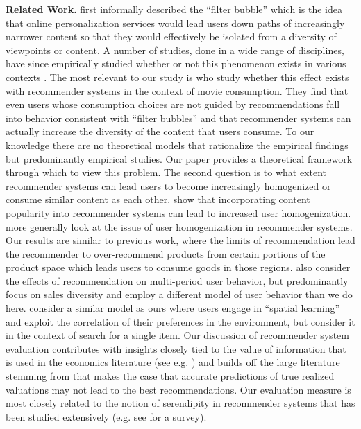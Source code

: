 \documentclass[sigconf]{acmart}
\begin{document}
\textbf{Related Work.} 
\cite{pariser2011filter} first informally described the ``filter bubble'' which is the idea that online personalization services would lead users down paths of increasingly narrower content so that they would effectively be isolated from a diversity of viewpoints or content. A number of studies, done in a wide range of disciplines, have since empirically studied whether or not this phenomenon exists in various contexts \cite{flaxman2016filter,hosanagar2013will,moller2018blame,nguyen2014exploring}. The most relevant to our study is \cite{nguyen2014exploring} who study whether this effect exists with recommender systems in the context of movie consumption. They find that even users whose consumption choices are not guided by recommendations fall into behavior consistent with ``filter bubbles'' and that recommender systems can actually increase the diversity of the content that users consume. To our knowledge there are no theoretical models that rationalize the empirical findings but predominantly empirical studies. Our paper provides a theoretical framework through which to view this problem.
The second question is to what extent recommender systems can lead users to become increasingly homogenized or consume similar content as each other. \cite{celam2008hits,treviranus2009value} show that incorporating content popularity into recommender systems can lead to increased user homogenization. \cite{chaney2018algorithmic} more generally look at the issue of user homogenization in recommender systems. Our results are similar to previous work, where the limits of recommendation lead the recommender to over-recommend products from certain portions of the product space which leads users to consume goods in those regions.
\cite{fleder2009blockbuster} also consider the effects of recommendation on multi-period user behavior, but predominantly focus on sales diversity and employ a different model of user behavior than we do here. \cite{hodgson2019horse} consider a similar model as ours where users engage in ``spatial learning'' and exploit the correlation of their preferences in the environment, but consider it in the context of search for a single item.
Our discussion of recommender system evaluation contributes with insights closely tied to the value of information that is used in the economics literature (see e.g. \cite{bergemann2019information}) and builds off the large literature stemming from \cite{mcnee2006being} that makes the case that accurate predictions of true realized valuations may not lead to the best recommendations. Our evaluation measure is most closely related to the notion of serendipity in recommender systems that has been studied extensively (e.g. see \cite{kotkov2016survey} for a survey).
\end{document}
